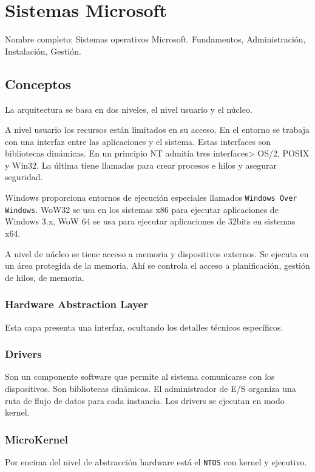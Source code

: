 \setcounter{section}{60} %
\section{Sistemas Microsoft}

Nombre completo: Sistemas operativos Microsoft. Fundamentos, Administración, Instalación, Gestión.

\localtableofcontents

\subsection{Conceptos}
    La arquitectura se basa en dos niveles, el nivel usuario y el núcleo. 

    A nivel usuario los recursos están limitados en su acceso. En el entorno se trabaja con una interfaz entre las aplicaciones y el sistema. Estas interfaces son bibliotecas dinámicas. En un principio NT admitía tres interfaces> OS/2, POSIX y Win32. La última tiene llamadas para crear procesos e hilos y asegurar seguridad.

    Windows proporciona entornos de ejecución especiales llamados \texttt{Windows Over Windows}. WoW32 se usa en los sistemas x86 para ejecutar aplicaciones de Windows 3.x, WoW 64 se usa para ejecutar aplicaciones de 32bits en sistemas x64.

    A nivel de núcleo se tiene acceso a memoria y dispositivos externos. Se ejecuta en un área protegida de la memoria. Ahí se controla el acceso a planificación, gestión de hilos, de memoria.

    \subsubsection{Hardware Abstraction Layer}
        Esta capa presenta una interfaz, ocultando los detalles técnicos específicos.

    \subsubsection{Drivers}
        Son un componente software que permite al sistema comunicarse con los dispositivos. Son bibliotecas dinámicas. El administrador de E/S organiza una ruta de flujo de datos para cada instancia. Los drivers se ejecutan en modo kernel.

    \subsubsection{MicroKernel}
        Por encima del nivel de abstracción hardware está el \texttt{NTOS} con kernel y ejecutivo.

